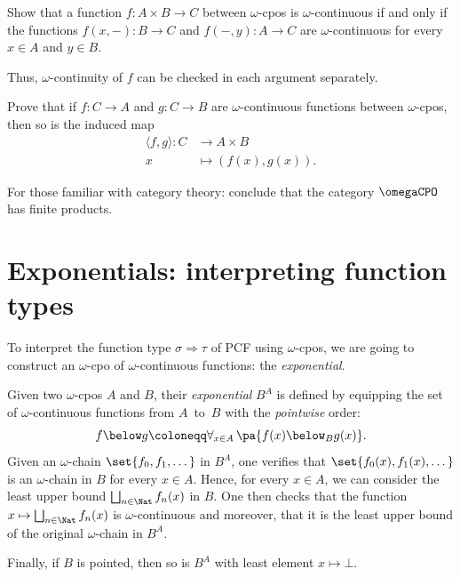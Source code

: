 \begin{exercise}\label{exer:continuity-in-each-argument}
  Show that a function \(f \colon A \times B \to C\) between \(\omega\)-cpos is
  \(\omega\)-continuous if and only if the functions \(f(x,-) \colon B \to C\) and
  \(f(-,y) \colon A \to C\) are \(\omega\)-continuous for every \(x \in A\) and
  \(y \in B\).

  Thus, \(\omega\)-continuity of \(f\) can be checked in each argument
  separately.
\end{exercise}

\begin{exercise}\label{exer:product-induced}
  Prove that if \(f \colon C \to A\) and \(g \colon C \to B\) are
  \(\omega\)-continuous functions between \(\omega\)-cpos, then so is the
  induced map
  \begin{align*}
    \langle f , g \rangle  \colon C &\to A \times B \\
    x &\mapsto (f(x),g(x)).
  \end{align*}

  For those familiar with category theory: conclude that the category
  \(\omegaCPO\) has finite products.
\end{exercise}

\section{Exponentials: interpreting function types}

To interpret the function type \(\sigma \Rightarrow \tau\) of PCF using
\(\omega\)-cpos, we are going to construct an \(\omega\)-cpo of
\(\omega\)-continuous functions: the \emph{exponential}.

\begin{definition}\label{def:exponential}
  Given two \(\omega\)-cpos \(A\) and \(B\), their \emph{exponential} \(B^A\) is
  defined by equipping the set of \(\omega\)-continuous functions from
  \(A\)~to~\(B\) with the \emph{pointwise} order:
  \[
    f \below g
    \coloneqq \forall_{x \in A} \, \pa{f(x) \below_B g(x)}.
  \]
  Given an \(\omega\)-chain \(\set{f_0,f_1,\dots}\) in \(B^A\), one verifies
  that \(\set{f_0(x),f_1(x),\dots}\) is an \(\omega\)-chain in \(B\) for every
  \(x \in A\).
  Hence, for every \(x \in A\), we can consider the least upper bound
  \(\bigsqcup_{n \in \Nat}f_n(x)\) in \(B\).
  One then checks that the function \(x \mapsto \bigsqcup_{n \in \Nat}f_n(x)\)
  is \(\omega\)-continuous and moreover, that it is the least upper bound of the
  original \(\omega\)-chain in \(B^A\).

  Finally, if \(B\) is pointed, then so is \(B^A\) with least
  element \(x \mapsto \bot\).
\end{definition}

